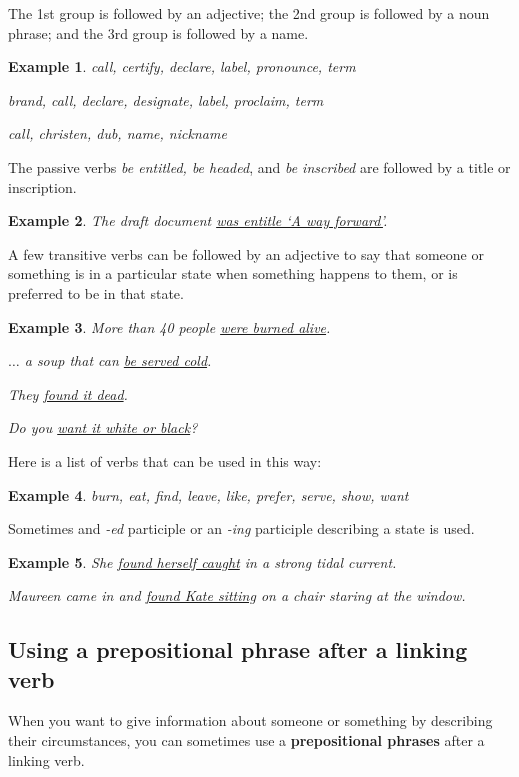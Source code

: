 \documentclass[oneside]{book}
\numberwithin{equation}{section}
\newtheorem{example}{Example}[section]
\begin{document}
The 1st group is followed by an adjective; the 2nd group is followed by a noun phrase; and the 3rd group is followed by a name.
\begin{example}
    call, certify, declare, label, pronounce, term
    
    brand, call, declare, designate, label, proclaim, term
    
    call, christen, dub, name, nickname
\end{example}
%
\noindent{} The passive verbs \textit{be entitled, be headed}, and \textit{be inscribed} are followed by a title or inscription.
\begin{example}
    The draft document \underline{was entitle `A way forward'}.
\end{example}
%
\noindent{} A few transitive verbs can be followed by an adjective to say that someone or something is in a particular state when something happens to them, or is preferred to be in that state.
\begin{example}
    More than 40 people \underline{were burned alive}.
    
    $\ldots$ a soup that can \underline{be served cold}.
    
    They \underline{found it dead}.
    
    Do you \underline{want it white or black}?
\end{example}
Here is a list of verbs that can be used in this way:
\begin{example}
    burn, eat, find, leave, like, prefer, serve, show, want
\end{example}
Sometimes and \textit{-ed} participle or an \textit{-ing} participle describing a state is used.
\begin{example}
    She \underline{found herself caught} in a strong tidal current.
    
    Maureen came in and \underline{found Kate sitting} on a chair staring at the window.
\end{example}

\subsection{Using a prepositional phrase after a linking verb}
\noindent{} When you want to give information about someone or something by describing their circumstances, you can sometimes use a \textbf{prepositional phrases} after a linking verb.
\end{document}

